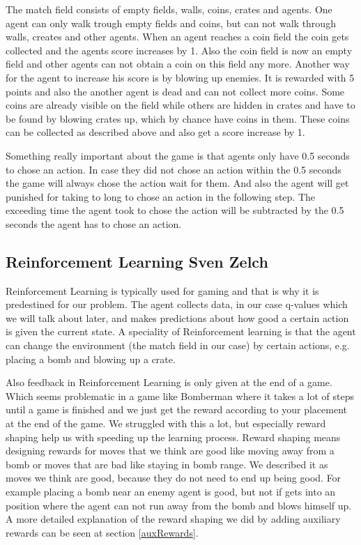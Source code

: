 \documentclass[
	letterpaper, %
	12pt, %
]{CSUniSchoolLabReport}
\begin{document}
	The match field consists of empty fields, walls, coins, crates and agents.
	One agent can only walk trough empty fields and coins, but can not walk through walls, creates and other agents.
	When an agent reaches a coin field the coin gets collected and the agents score increases by 1. 
	Also the coin field is now an empty field and other agents can not obtain a coin on this field any more. 
	Another way for the agent to increase his score is by blowing up enemies. 
	It is rewarded with 5 points and also the another agent is dead and can not collect more coins.
	Some coins are already visible on the field while others are hidden in crates and have to be found by blowing crates up, which by chance have coins in them.
	These coins can be collected as described above and also get a score increase by 1.
	
	Something really important about the game is that agents only have 0.5 seconds to chose an action.
	In case they did not chose an action within the 0.5 seconds the game will always chose the action wait for them.
	And also the agent will get punished for taking to long to chose an action in the following step.
	The exceeding time the agent took to chose the action will be subtracted by the 0.5 seconds the agent has to chose an action.

\subsection{Reinforcement Learning \tiny Sven Zelch}
	Reinforcement Learning is typically used for gaming and that is why it is predestined for our problem.
	The agent collects data, in our case q-values which we will talk about later, and makes predictions about how good a certain action is given the current state.
	A speciality of Reinforcement learning is that the agent can change the environment (the match field in our case) by certain actions, e.g. placing a bomb and blowing up a crate.
	
	Also feedback in Reinforcement Learning is only given at the end of a game. 
	Which seems problematic in a game like Bomberman where it takes a lot of steps until a game is finished and we just get the reward according to your placement at the end of the game.
	We struggled with this a lot, but especially reward shaping help us with speeding up the learning process.
	Reward shaping means designing rewards for moves that we think are good like moving away from a bomb or moves that are bad like staying in bomb range.
	We described it as moves we think are good, because they do not need to end up being good.
	For example placing a bomb near an enemy agent is good, but not if gets into an position where the agent can not run away from the bomb and blows himself up.
	A more detailed explanation of the reward shaping we did by adding auxiliary rewards can be seen at section \ref{auxRewards}.
\end{document}
